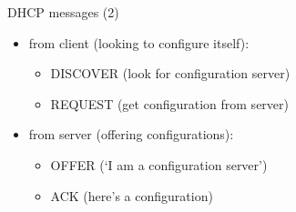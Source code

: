 \begin{frame}{DHCP messages (2)}
    \begin{itemize}
    \item from client (looking to configure itself):
        \begin{itemize}
        \item DISCOVER (look for configuration server)
        \item REQUEST (get configuration from server)
        \end{itemize}
    \item from server (offering configurations):
        \begin{itemize}
        \item OFFER (`I am a configuration server')
        \item ACK (here's a configuration)
        \end{itemize}
    \end{itemize}
\end{frame}


